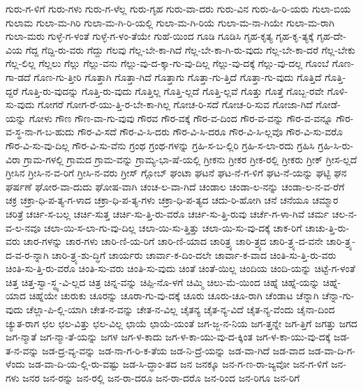 {ಗುರು-ಗ-ಳಿಗೆ
ಗುರು-ಗಳು
ಗುರು-ಗ-ಳೆಲ್ಲ
ಗುರು-ಗೃಹ
ಗುರು-ವಾ-ದರು
ಗುರು-ವಿನ
ಗುರು-ಹಿ-ರಿ-ಯರು
ಗುಲಾ-ಬಿಯ
ಗುಲಾಮ
ಗುಲಾ-ಮ-ಗಿರಿ
ಗುಲಾ-ಮ-ಗಿ-ರಿ-ಯಲ್ಲಿ
ಗುಲಾ-ಮ-ಗಿ-ರಿಯೆ
ಗುಲಾ-ಮ-ನಾ-ಗಿಯೇ
ಗುಲಾ-ಮ-ರಾಗಿ
ಗುಲಾ-ಮರು
ಗುಳ್ಳೆ-ಗ-ಳಂತೆ
ಗುಳ್ಳೆ-ಗ-ಳಂ-ತೆಯೇ
ಗುಹೆ-ಯಿಂದ
ಗೂಡಿ
ಗೂಡಿಸಿ
ಗೃಹ-ಕೃತ್ಯ
ಗೃಹ-ಕೃ-ತ್ಯಕ್ಕೆ
ಗೃಹ-ದೇ-ವಿಯ
ಗೆದ್ದ
ಗೆದ್ದಿ-ರು-ವರು
ಗೆದ್ದು
ಗೆಲವು
ಗೆಲ್ಲ-ಬೇ-ಕಾ-ಗಿದೆ
ಗೆಲ್ಲ-ಬೇ-ಕಾ-ಗಿ-ರು-ವುದು
ಗೆಲ್ಲ-ಬೇ-ಕಾ-ದರೆ
ಗೆಲ್ಲ-ಬೇಕು
ಗೆಲ್ಲ-ಲಿಲ್ಲ
ಗೆಲ್ಲಲು
ಗೆಲ್ಲು
ಗೆಲ್ಲು-ವನು
ಗೆಲ್ಲು-ವು-ದ-ಕ್ಕಾ-ಗು-ವು-ದಿಲ್ಲ
ಗೆಲ್ಲು-ವು-ದಕ್ಕೆ
ಗೆಲ್ಲು-ವು-ದಲ್ಲ
ಗೊಂಬೆ
ಗೊಣ-ಗಾ-ಡದೆ
ಗೊಣ-ಗು-ತ್ತೀರಿ
ಗೊತ್ತಾಗಿ
ಗೊತ್ತಾ-ಗಿದೆ
ಗೊತ್ತಾಗು
ಗೊತ್ತಾ-ಗು-ತ್ತಿದೆ
ಗೊತ್ತಾ-ಗು-ವುದು
ಗೊತ್ತಿದೆ
ಗೊತ್ತಿ-ದ್ದರೆ
ಗೊತ್ತಿ-ರು-ವುದನ್ನು
ಗೊತ್ತಿ-ರು-ವುದು
ಗೊತ್ತಿಲ್ಲ
ಗೊತ್ತಿ-ಲ್ಲದೆ
ಗೊತ್ತಿ-ಲ್ಲವೆ
ಗೊತ್ತು
ಗೊತ್ತೆ
ಗೊಬ್ಬ-ರವೇ
ಗೊಳಿ-ಸು-ವುದು
ಗೋಗರೆ
ಗೋಗ-ರೆ-ಯು-ತ್ತಿ-ರ-ಬೇ-ಕಾ-ಗಿಲ್ಲ
ಗೋಚ-ರಿ-ಸದೆ
ಗೋಚ-ರಿ-ಸುವ
ಗೋಜಾ-ಗಿದೆ
ಗೋಡೆ-ಯನ್ನು
ಗೋಳು
ಗೌಣ
ಗೌಣ-ವಾ-ಗು-ವುವು
ಗೌರವ
ಗೌರ-ವಕ್ಕೆ
ಗೌರ-ವ-ದಿಂದ
ಗೌರ-ವ-ವನ್ನು
ಗೌರ-ವ-ವನ್ನೂ
ಗೌರ-ವ-ಸ್ಥ-ನಾ-ಗ-ಬ-ಹುದು
ಗೌರ-ವಿ-ಸದೆ
ಗೌರ-ವಿ-ಸಿ-ದರು
ಗೌರ-ವಿ-ಸಿ-ದರೂ
ಗೌರ-ವಿ-ಸಿ-ಲ್ಲವೊ
ಗೌರ-ವಿ-ಸು-ವರೊ
ಗೌರ-ವಿ-ಸು-ವು-ದಿಲ್ಲ
ಗೌರ-ವಿ-ಸು-ವೆನು
ಗ್ರಂಥ
ಗ್ರಂಥ-ಗಳನ್ನು
ಗ್ರಹಿ-ಸ-ಬ-ಲ್ಲಿರಿ
ಗ್ರಹಿ-ಸ-ಲಾ-ರದು
ಗ್ರಹಿಸಿ
ಗ್ರಹಿ-ಸಿ-ರು-ವಿರಾ
ಗ್ರಾಮ-ಗಳಲ್ಲಿ
ಗ್ರಾಮದ
ಗ್ರಾಮ-ವನ್ನು
ಗ್ರಾಮ್ಯ-ಭಾ-ಷೆ-ಯಲ್ಲಿ
ಗ್ರೀಕನು
ಗ್ರೀಕರ
ಗ್ರೀಕ-ರಲ್ಲಿ
ಗ್ರೀಕರು
ಗ್ರೀಕ್
ಗ್ರೀಸ-ಲ್ಲದೆ
ಗ್ರೀಸಿನ
ಗ್ರೀಸಿ-ನ-ವ-ರಿಗೆ
ಗ್ರೀಸಿ-ನ-ವರು
ಗ್ರೀಸ್
ಗ್ಲೋಬ್
ಘಂಟಾ
ಘಟನೆ
ಘಟ-ನೆ-ಗ-ಳಿಗೆ
ಘಟ-ನೆ-ಯನ್ನು
ಘಟ್ಟಿ
ಘನ
ಘರ್ಷಣೆ
ಘೋರ-ವಾ-ದುದು
ಘೋಷ-ವಾಗಿ
ಚಂಚ-ಲ-ವಾ-ಗಿದೆ
ಚಂಡಾಲ
ಚಂಡಾ-ಲ-ನನ್ನು
ಚಂಡಾ-ಲ-ನ-ವ-ರೆಗೆ
ಚಕ್ರ
ಚಕ್ರಾ-ಧಿ-ಪ-ತ್ಯ-ಗ-ಳಾದ
ಚಕ್ರಾ-ಧಿ-ಪ-ತ್ಯ-ಗಳು
ಚಕ್ರಾ-ಧಿ-ಪ-ತ್ಯದ
ಚದು-ರಿ-ಹೋಗಿ
ಚನೆ
ಚನೆಯೂ
ಚಮ್ಮಾರ
ಚರಿತ್ರೆ
ಚರ್ಚಿ-ಸ-ಬಲ್ಲ
ಚರ್ಚಿ-ಸುತ್ತ
ಚರ್ಚಿ-ಸು-ತ್ತಿ-ರು-ವರೊ
ಚರ್ಚಿ-ಸು-ತ್ತಿ-ರುವು
ಚರ್ಚೆ-ಗ-ಳಾ-ಗಿವೆ
ಚರ್ಮ
ಚಲ-ನ-ವ-ಲ-ನವೂ
ಚಲಾ-ಯಿ-ಸ-ಲಾ-ಗು-ವು-ದಿಲ್ಲ
ಚಲಾ-ಯಿ-ಸು-ತ್ತಿತ್ತು
ಚಲಾ-ಯಿ-ಸು-ವು-ದಕ್ಕೆ
ಚಾಕ-ರಿಗೆ
ಚಾಚು-ತ್ತಿ-ರು-ವರು
ಚಾರ-ಗಳನ್ನು
ಚಾರ-ಗಳು
ಚಾರಿ-ಣಿ-ಯ-ರಿಗೆ
ಚಾರಿ-ಣಿ-ಯಾದ
ಚಾರಿತ್ರ್ಯ
ಚಾರಿ-ತ್ರ್ಯದ
ಚಾರಿ-ತ್ರ್ಯ-ದ-ವನೇ
ಚಾರಿ-ತ್ರ್ಯ-ದ-ವ-ರ-ನ್ನಾಗಿ
ಚಾರಿ-ತ್ರ್ಯ-ಶು-ದ್ಧಿಗೆ
ಚಾರ್ಯರು
ಚಾರ್ವಾ-ಕ-ದಿಂ-ದಲೇ
ಚಾರ್ವಾ-ಕ-ವಾದ
ಚಿಂತಿ-ಸು-ತ್ತಿ-ರು-ವರು
ಚಿಂತಿ-ಸು-ತ್ತಿ-ರು-ವರೊ
ಚಿಂತಿ-ಸು-ವರು
ಚಿಂತಿ-ಸು-ವುದು
ಚಿಂತೆ
ಚಿಂತೆ-ಯಿಲ್ಲ
ಚಿಂದಿಯ
ಚಿಂದಿ-ಯನ್ನು
ಚಿಟ್ಟೆ-ಗ-ಳಂತೆ
ಚಿತ್ತ
ಚಿತ್ತ-ಸ್ವಾ-ಸ್ಥ್ಯ-ವಿ-ಲ್ಲದ
ಚಿತ್ರ
ಚಿನ್ನ-ವನ್ನು
ಚಿಪ್ಪಿ-ನೊ-ಳಗೆ
ಚಿಮ್ಮಿ
ಚಿಲು-ಮೆ-ಯಿಂದ
ಚಿಹ್ನೆ
ಚಿಹ್ನೆ-ಯನ್ನು
ಚಿಹ್ನೆ-ಯಾದ
ಚಿಹ್ನೆಯೇ
ಚುರುಕು
ಚೂರನ್ನು
ಚೂರಾ-ಗು-ವು-ದಕ್ಕೆ
ಚೂರು
ಚೂರು-ಚೂ-ರಾಗಿ
ಚೆಂಡಾಟ
ಚೆನ್ನಾಗಿ
ಚೆನ್ನಾ-ಗು-ವುದು
ಚೆಲ್ಲಾ-ಪಿ-ಲ್ಲಿ-ಯಾಗಿ
ಚೇತ-ನ-ವನ್ನು
ಚೇತ-ನ-ವಿಲ್ಲ
ಚೈತನ್ಯ
ಚೈತ-ನ್ಯ-ವಿದೆ
ಚೈತ-ನ್ಯ-ವೆಂದು
ಚೈನಾ-ದಿಂದ
ಚ್ಯುತ-ರಾಗ
ಛಲ
ಛಲ-ವಿತ್ತು
ಛಲ-ವಿಲ್ಲ
ಛಾಯೆ
ಛಾಯೆ-ಯಂತೆ
ಜಗ-ಜ್ಜ-ನ-ನಿಯ
ಜಗ-ತ್ತನ್ನೇ
ಜಗ-ತ್ತಿಗೆ
ಜಗತ್ತು
ಜಗದ
ಜಗ-ನ್ಮಾತೆ
ಜಗ-ನ್ಮಾ-ತೆ-ಯನ್ನು
ಜಗಳ
ಜಗ-ಳ-ಕಾದು
ಜಗ-ಳ-ಕಾ-ಯು-ವು-ದ-ಕ್ಕಿಂತ
ಜಗ-ಳ-ಕಾ-ಯು-ವು-ದಕ್ಕೆ
ಜಡ-ತ-ನ-ವನ್ನು
ಜಡ-ದ್ರ-ವ್ಯ-ವನ್ನು
ಜಡ-ನಾ-ಗ-ರಿ-ಕ-ತೆಯ
ಜಡ-ನಿ-ದ್ರೆ-ಯನ್ನು
ಜಡ-ವಾ-ಗಿದೆ
ಜಡ-ವಾದ
ಜಡ-ವಾ-ದಿ-ಗ-ಳೆಂದು
ಜಡ-ವಾ-ದಿ-ಯ-ಲ್ಲಿ-ರು-ವಷ್ಟು
ಜಡ-ಸಿ-ದ್ಧಾಂ-ತದ
ಜನ
ಜನಕ್ಕೂ
ಜನ-ಗ-ಣ-ರಾ-ಜ್ಯವೋ
ಜನ-ಗ-ಳಿಗೆ
ಜನ-ಗಳು
ಜನರ
ಜನ-ರನ್ನು
ಜನ-ರಲ್ಲಿ
ಜನ-ರಾ-ದರೂ
ಜನ-ರಾ-ದರೊ
ಜನ-ರಿಂದ
ಜನ-ರಿಗೂ
ಜನ-ರಿಗೆ
}
